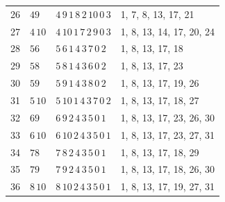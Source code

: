 \begin{longtable}{r l l l}
26 & $49$ & $4\,9\,1\,8\,2\,10\,0\,3$ & 1, 7, 8, 13, 17, 21 \\
27 & $4\,10$ & $4\,10\,1\,7\,2\,9\,0\,3$ & 1, 8, 13, 14, 17, 20, 24 \\
28 & $56$ & $5\,6\,1\,4\,3\,7\,0\,2$ & 1, 8, 13, 17, 18 \\
29 & $58$ & $5\,8\,1\,4\,3\,6\,0\,2$ & 1, 8, 13, 17, 23 \\
30 & $59$ & $5\,9\,1\,4\,3\,8\,0\,2$ & 1, 8, 13, 17, 19, 26 \\
31 & $5\,10$ & $5\,10\,1\,4\,3\,7\,0\,2$ & 1, 8, 13, 17, 18, 27 \\
32 & $69$ & $6\,9\,2\,4\,3\,5\,0\,1$ & 1, 8, 13, 17, 23, 26, 30 \\
33 & $6\,10$ & $6\,10\,2\,4\,3\,5\,0\,1$ & 1, 8, 13, 17, 23, 27, 31 \\
34 & $78$ & $7\,8\,2\,4\,3\,5\,0\,1$ & 1, 8, 13, 17, 18, 29 \\
35 & $79$ & $7\,9\,2\,4\,3\,5\,0\,1$ & 1, 8, 13, 17, 18, 26, 30 \\
36 & $8\,10$ & $8\,10\,2\,4\,3\,5\,0\,1$ & 1, 8, 13, 17, 19, 27, 31 \\
\bottomrule
\end{longtable}